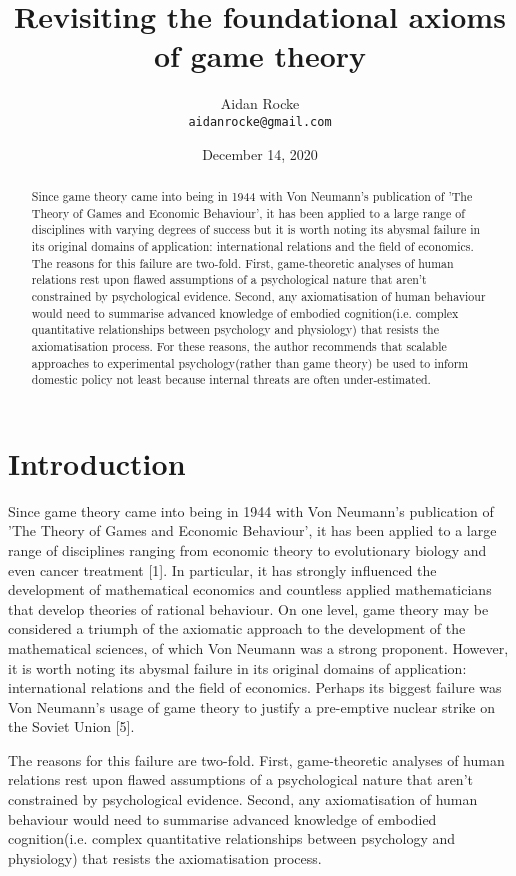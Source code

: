 \documentclass{article}
\title{Revisiting the foundational axioms of game theory}
\date{December 14, 2020}
\author{%
  Aidan Rocke\\
  \texttt{aidanrocke@gmail.com} \\
}
\begin{document}
\maketitle

\begin{abstract}
   Since game theory came into being in 1944 with Von Neumann's publication of 'The Theory of Games and Economic Behaviour', it has been applied to a large range of disciplines with varying degrees of success but it is worth noting its abysmal failure in its original domains of application: international relations and the field of economics. The reasons for this failure are two-fold. First, game-theoretic analyses of human relations rest upon flawed assumptions of a psychological nature that aren't constrained by psychological evidence. Second, any axiomatisation of human behaviour would need to summarise advanced knowledge of embodied cognition(i.e. complex quantitative relationships between psychology and physiology) that resists the axiomatisation process. For these reasons, the author recommends that scalable approaches to experimental psychology(rather than game theory) be used to inform domestic policy not least because internal threats are often under-estimated. 
\end{abstract}

\section{Introduction}

Since game theory came into being in 1944 with Von Neumann's publication of 'The Theory of Games and Economic Behaviour', it has been applied to a large range of disciplines ranging from economic theory to evolutionary biology and even cancer treatment [1]. In particular, it has strongly influenced the development of mathematical economics and countless applied mathematicians that develop theories of rational behaviour. On one level, game theory may be considered a triumph of the axiomatic approach to the development of the mathematical sciences, of which Von Neumann was a strong proponent. However, it is worth noting its abysmal failure in its original domains of application: international relations and the field of economics. Perhaps its biggest failure was Von Neumann's usage of game theory to justify a pre-emptive nuclear strike on the Soviet Union [5]. 

	The reasons for this failure are two-fold. First, game-theoretic analyses of human relations rest upon flawed assumptions of a psychological nature that aren't constrained by psychological evidence. Second, any axiomatisation of human behaviour would need to summarise advanced knowledge of embodied cognition(i.e. complex quantitative relationships between psychology and physiology) that resists the axiomatisation process. 
	
\end{document}
